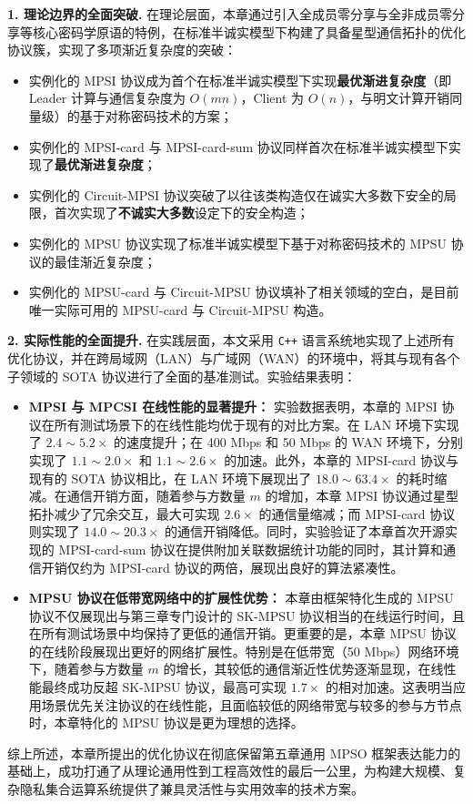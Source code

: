 \begin{trivlist}
\item \textbf{1. 理论边界的全面突破.} 
在理论层面，本章通过引入全成员零分享与全非成员零分享等核心密码学原语的特例，在标准半诚实模型下构建了具备星型通信拓扑的优化协议簇，实现了多项渐近复杂度的突破：
\begin{itemize}[itemsep=2pt,topsep=2pt,parsep=0pt,leftmargin=15pt]
    \item 实例化的 MPSI 协议成为首个在标准半诚实模型下实现\textbf{最优渐进复杂度}（即 Leader 计算与通信复杂度为 $O(mn)$，Client 为 $O(n)$，与明文计算开销同量级）的基于对称密码技术的方案；
    \item 实例化的 MPSI-card 与 MPSI-card-sum 协议同样首次在标准半诚实模型下实现了\textbf{最优渐进复杂度}；
    \item 实例化的 Circuit-MPSI 协议突破了以往该类构造仅在诚实大多数下安全的局限，首次实现了\textbf{不诚实大多数}设定下的安全构造；
    \item 实例化的 MPSU 协议实现了标准半诚实模型下基于对称密码技术的 MPSU 协议的最佳渐近复杂度；
    \item 实例化的 MPSU-card 与 Circuit-MPSU 协议填补了相关领域的空白，是目前唯一实际可用的 MPSU-card 与 Circuit-MPSU 构造。
\end{itemize}

\item \textbf{2. 实际性能的全面提升.} 
在实践层面，本文采用 \texttt{C++} 语言系统地实现了上述所有优化协议，并在跨局域网（LAN）与广域网（WAN）的环境中，将其与现有各个子领域的 SOTA 协议进行了全面的基准测试。实验结果表明：
\begin{itemize}[itemsep=2pt,topsep=2pt,parsep=0pt,leftmargin=15pt]
    \item \textbf{MPSI 与 MPCSI 在线性能的显著提升：} 实验数据表明，本章的 MPSI 协议在所有测试场景下的在线性能均优于现有的对比方案。在 LAN 环境下实现了 $2.4 \sim 5.2 \times$ 的速度提升；在 400 Mbps 和 50 Mbps 的 WAN 环境下，分别实现了 $1.1 \sim 2.0 \times$ 和 $1.1 \sim 2.6 \times$ 的加速。此外，本章的 MPSI-card 协议与现有的 SOTA 协议相比，在 LAN 环境下展现出了 $18.0 \sim 63.4 \times$ 的耗时缩减。在通信开销方面，随着参与方数量 $m$ 的增加，本章 MPSI 协议通过星型拓扑减少了冗余交互，最大可实现 $2.6 \times$ 的通信量缩减；而 MPSI-card 协议则实现了 $14.0 \sim 20.3 \times$ 的通信开销降低。同时，实验验证了本章首次开源实现的 MPSI-card-sum 协议在提供附加关联数据统计功能的同时，其计算和通信开销仅约为 MPSI-card 协议的两倍，展现出良好的算法紧凑性。
    \item \textbf{MPSU 协议在低带宽网络中的扩展性优势：} 本章由框架特化生成的 MPSU 协议不仅展现出与第三章专门设计的 SK-MPSU 协议相当的在线运行时间，且在所有测试场景中均保持了更低的通信开销。更重要的是，本章 MPSU 协议的在线阶段展现出更好的网络扩展性。特别是在低带宽（50 Mbps）网络环境下，随着参与方数量 $m$ 的增长，其较低的通信渐近性优势逐渐显现，在线性能最终成功反超 SK-MPSU 协议，最高可实现 $1.7 \times$ 的相对加速。这表明当应用场景优先关注协议的在线性能，且面临较低的网络带宽与较多的参与方节点时，本章特化的 MPSU 协议是更为理想的选择。
\end{itemize}
\end{trivlist}
综上所述，本章所提出的优化协议在彻底保留第五章通用 MPSO 框架表达能力的基础上，成功打通了从理论通用性到工程高效性的最后一公里，为构建大规模、复杂隐私集合运算系统提供了兼具灵活性与实用效率的技术方案。